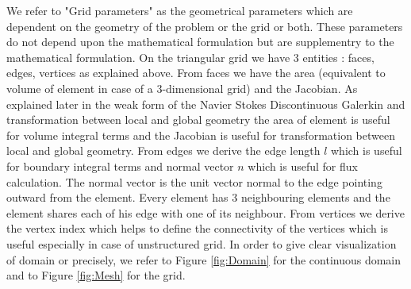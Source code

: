 \documentclass[a4paper,12pt]{book}
\begin{document}
We refer to "Grid parameters" as the geometrical parameters which are dependent on the geometry of the problem or the grid or both. These parameters do not depend upon the mathematical formulation but are supplementry to the mathematical formulation. On the triangular grid we have 3 entities : faces, edges, vertices as explained above. From faces we have the area (equivalent to volume of element in case of a 3-dimensional grid) and the Jacobian. As explained later in the weak form of the Navier Stokes Discontinuous Galerkin and transformation between local and global geometry the area of element is useful for volume integral terms and the Jacobian is useful for transformation between local and global geometry. From edges we derive the edge length $l$ which is useful for boundary integral terms and normal vector $n$ which is useful for flux calculation. The normal vector is the unit vector normal to the edge pointing outward from the element. Every element has 3 neighbouring elements and the element shares each of his edge with one of its neighbour. From vertices we derive the vertex index which helps to define the connectivity of the vertices which is useful especially in case of unstructured grid. In order to give clear visualization of domain or precisely, we refer to Figure \ref{fig:Domain} for the continuous domain and to Figure \ref{fig:Mesh} for the grid.
\end{document}
